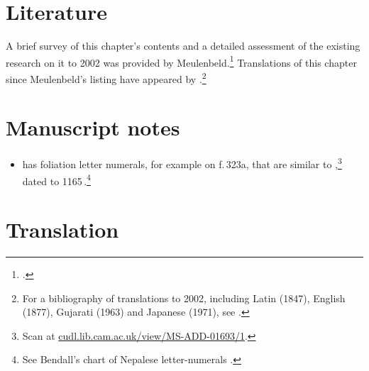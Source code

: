 \section{Literature}

A brief survey of this chapter's contents and a detailed assessment of
the existing research on it to 2002 was provided by
Meulenbeld.\footcite[IA, 289--290]{meul-hist} Translations of this
chapter since Meulenbeld's listing have appeared by
\textcites[131--139]{wuja-2003}[3,
1--15]{shar-1999}{srik-2002}.\footnote{For a bibliography of translations
    to 2002, including Latin (1847), English (1877), Gujarati (1963) and
    Japanese (1971), see \cite[IB, 314--315]{meul-hist}.}


\section{Manuscript notes}

\begin{itemize}
    \item {} has foliation letter numerals, for example
on f.\,323a, that are similar to ,\footnote{Scan
at 
\href{https://cudl.lib.cam.ac.uk/view/MS-ADD-01693/1}
{cudl.lib.cam.ac.uk/view/MS-ADD-01693/1}.}
 dated to 1165\,\CE.\footnote{See Bendall's chart of Nepalese 
 letter-numerals \citep[Lithograph V, 
after p.\,225]{bend-budd}.}
\end{itemize}

\newpage

\section{Translation}

